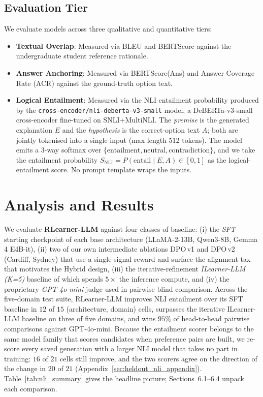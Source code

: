 \subsection{Evaluation Tier}
\label{sec:eval_tier}
We evaluate models across three qualitative and quantitative tiers:
\begin{itemize}
    \item \textbf{Textual Overlap}: Measured via BLEU and BERTScore against the undergraduate student reference rationale.
    \item \textbf{Answer Anchoring}: Measured via BERTScore(Ans) and Answer Coverage Rate (ACR) against the ground-truth option text.
    \item \textbf{Logical Entailment}: Measured via the NLI entailment probability produced by the \texttt{cross-encoder/nli-deberta-v3-small} model, a DeBERTa-v3-small cross-encoder fine-tuned on SNLI+MultiNLI. The \emph{premise} is the generated explanation $E$ and the \emph{hypothesis} is the correct-option text $A$; both are jointly tokenised into a single input (max length 512 tokens). The model emits a 3-way softmax over $\{\text{entailment},\text{neutral},\text{contradiction}\}$, and we take the entailment probability $S_{\text{NLI}} = P(\text{entail} \mid E, A) \in [0,1]$ as the logical-entailment score. No prompt template wraps the inputs.
\end{itemize}

\section{Analysis and Results}

We evaluate \textbf{RLearner-LLM} against four classes of baseline: (i) the \emph{SFT} starting checkpoint of each base architecture (LLaMA-2-13B, Qwen3-8B, Gemma 4 E4B-it), (ii) two of our own intermediate ablations DPO\,v1 and DPO\,v2 (Cardiff, Sydney) that use a single-signal reward and surface the alignment tax that motivates the Hybrid design, (iii) the iterative-refinement \emph{ILearner-LLM (K=5)} baseline of \cite{bao2025exploring} which spends $5\times$ the inference compute, and (iv) the proprietary \emph{GPT-4o-mini} judge used in pairwise blind comparison. Across the five-domain test suite, RLearner-LLM improves NLI entailment over its SFT baseline in $12$ of $15$ (architecture, domain) cells, surpasses the iterative ILearner-LLM baseline on three of five domains, and wins $95\%$ of head-to-head pairwise comparisons against GPT-4o-mini. Because the entailment scorer belongs to the same model family that scores candidates when preference pairs are built, we re-score every saved generation with a larger NLI model that takes no part in training: $16$ of $21$ cells still improve, and the two scorers agree on the direction of the change in $20$ of $21$ (Appendix~\ref{sec:heldout_nli_appendix}). Table~\ref{tab:nli_summary} gives the headline picture; Sections~6.1--6.4 unpack each comparison.

